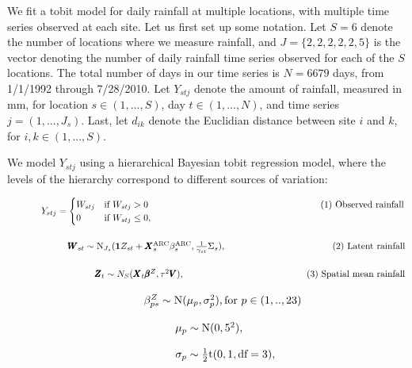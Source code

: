 \documentclass[12pt]{article}
\def\bbeta{\pmb{\beta}}
\def\bX{\pmb{X}}
\def\bZ{\pmb{Z}}
\def\bV{\pmb{V}}
\def\bW{\pmb{W}}
\begin{document}
We fit a tobit model for daily rainfall at multiple locations, with multiple time series observed at each site. Let us first set up some notation. Let $S=6$ denote the number of locations where we measure rainfall, and $J = \{2,2,2,2,2,5\}$ is the vector denoting the number of daily rainfall time series observed for each of the $S$ locations. The total number of days in our time series is $N=6679$ days, from 1/1/1992 through 7/28/2010. Let $Y_{stj}$ denote the amount of rainfall, measured in mm, for location $s \in (1,...,S)$, day $t \in (1,...,N)$, and time series $j = (1,...,J_s)$. Last, let $d_{ik}$ denote the Euclidian distance between site $i$ and $k$, for $i,k \in (1,...,S)$.

We model $Y_{stj}$ using a hierarchical Bayesian tobit regression model, where the levels of the hierarchy correspond to different sources of variation:

\newpage

$\hspace{0.5in}
Y_{stj} = \begin{cases} W_{stj} &\mbox{if } W_{stj} > 0 \hspace{2.6in} \text{(1) Observed rainfall}\\
0  &\mbox{if } W_{stj} \leq 0, \end{cases}
$

$\hspace{0.9in}
\bW_{st} \sim \text{N}_{J_s}(\mathbf{1}Z_{st} + \bX^\text{ARC}_s \beta^\text{ARC}_s, \frac{1}{\gamma_{st}}\Sigma_s), \hspace{1.6in} \text{(2) Latent rainfall}
$

$\hspace{1.3in}
\bZ_t \sim N_S(\bX_t \bbeta^Z, \tau^2\bV), \hspace{1.85in} \text{(3) Spatial mean rainfall}
$

$\hspace{1.7in}
\beta_{ps}^Z \sim \text{N}(\mu_p, \sigma^2_p),  \text{for $p \in (1,..,23)$}
$

$\hspace{2.1in}
\mu_{p} \sim \text{N}(0, 5^2),
$

$\hspace{2.1in}
\sigma_{p} \sim \frac{1}{2}\text{t}(0, 1, \text{df} = 3),
$
\end{document}
